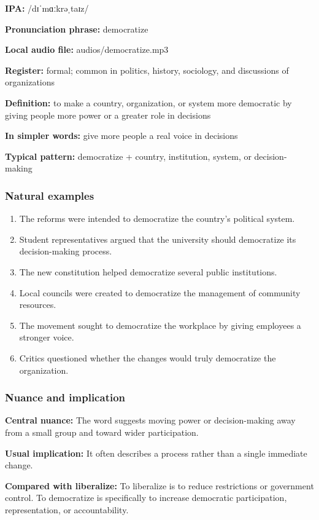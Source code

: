\documentclass[11pt]{article}
\begin{document}
\textbf{IPA:} /dɪˈmɑːkrəˌtaɪz/

\textbf{Pronunciation phrase:} democratize

\textbf{Local audio file:} audios/democratize.mp3

\textbf{Register:} formal; common in politics, history, sociology, and discussions of organizations

\textbf{Definition:} to make a country, organization, or system more democratic by giving people more power or a greater role in decisions

\textbf{In simpler words:} give more people a real voice in decisions

\textbf{Typical pattern:} democratize + country, institution, system, or decision-making

\subsubsection{Natural examples}
\begin{enumerate}
  \item The reforms were intended to democratize the country's political system.
  \item Student representatives argued that the university should democratize its decision-making process.
  \item The new constitution helped democratize several public institutions.
  \item Local councils were created to democratize the management of community resources.
  \item The movement sought to democratize the workplace by giving employees a stronger voice.
  \item Critics questioned whether the changes would truly democratize the organization.
\end{enumerate}

\subsubsection{Nuance and implication}
\textbf{Central nuance:} The word suggests moving power or decision-making away from a small group and toward wider participation.

\textbf{Usual implication:} It often describes a process rather than a single immediate change.

\textbf{Compared with liberalize:} To liberalize is to reduce restrictions or government control. To democratize is specifically to increase democratic participation, representation, or accountability.
\end{document}
